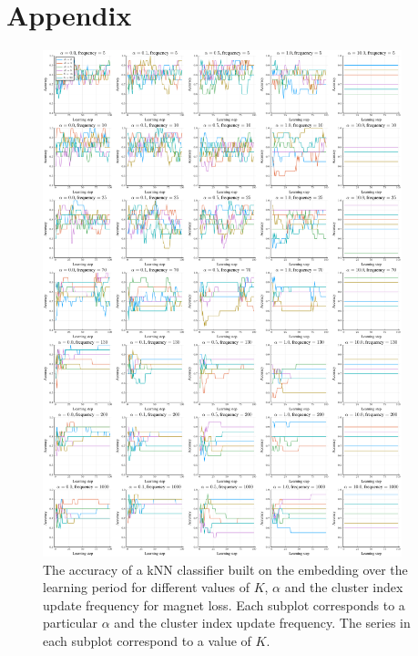 \chapter*{Appendix}

\begin{figure}[h]
  \centering
  \includegraphics[width=0.93\textwidth]{images/magnet-gridsearch/accuracy/K/magnet-gridsearch-accuracy-K.pdf}
  \caption{The accuracy of a kNN classifier built on the embedding over the learning period for different values of \( K \), \( \alpha \) and the cluster index update frequency for magnet loss. Each subplot corresponds to a particular \( \alpha \) and the cluster index update frequency. The series in each subplot correspond to a value of \( K \).}\label{fig:magnet-gridsearch-accuracy}
\end{figure}

